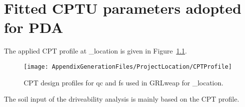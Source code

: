 

\chapter{Fitted CPTU parameters adopted for PDA}\label{sec_1}
The applied CPT profile at  \ID_location is given in Figure~\ref{CPT_basis}.
\begin{figure}[H]
\texttt{[image: AppendixGenerationFiles/ProjectLocation/CPTProfile]} %
\caption{CPT design profiles for qc and fs used in GRLweap for {\ID_location}.}
\label{CPT_basis}
\end{figure}

The soil input of the driveability analysis is mainly based on the CPT profile.


